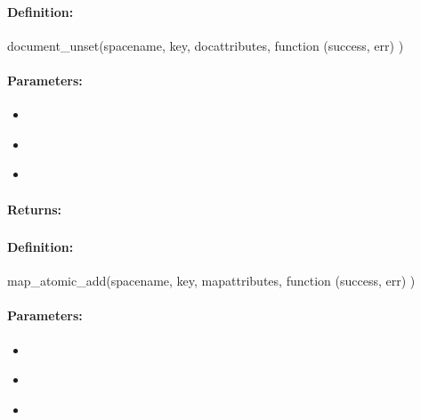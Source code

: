 \paragraph{Definition:}
\begin{javascriptcode}
document_unset(spacename, key, docattributes, function (success, err) {})
\end{javascriptcode}
\paragraph{Parameters:}
\begin{itemize}[noitemsep]
\item {}\\

\item {}\\

\item {}\\

\end{itemize}

\paragraph{Returns:}


\pagebreak
\subsubsection{}
\label{api:nodejs:map_atomic_add}


\paragraph{Definition:}
\begin{javascriptcode}
map_atomic_add(spacename, key, mapattributes, function (success, err) {})
\end{javascriptcode}
\paragraph{Parameters:}
\begin{itemize}[noitemsep]
\item {}\\

\item {}\\

\item {}\\

\end{itemize}

